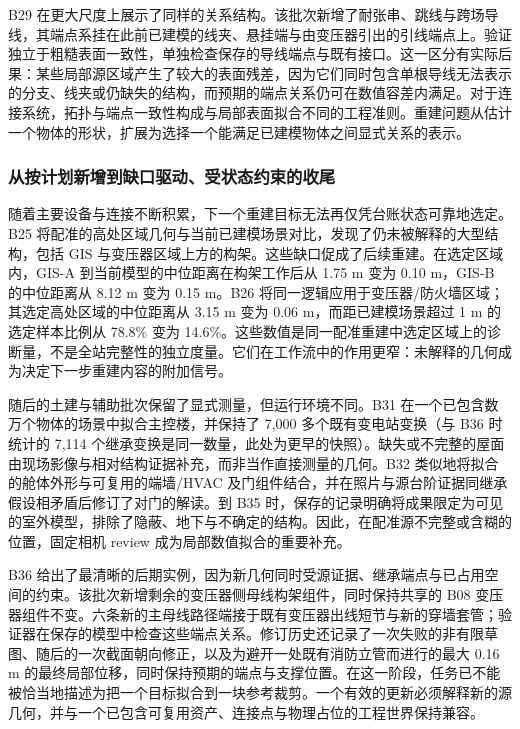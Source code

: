 \documentclass[10pt,a4paper]{article}
\begin{document}
B29
在更大尺度上展示了同样的关系结构。该批次新增了耐张串、跳线与跨场导线，其端点系挂在此前已建模的线夹、悬挂端与由变压器引出的引线端点上。验证独立于粗糙表面一致性，单独检查保存的导线端点与既有接口。这一区分有实际后果：某些局部源区域产生了较大的表面残差，因为它们同时包含单根导线无法表示的分支、线夹或仍缺失的结构，而预期的端点关系仍可在数值容差内满足。对于连接系统，拓扑与端点一致性构成与局部表面拟合不同的工程准则。重建问题从估计一个物体的形状，扩展为选择一个能满足已建模物体之间显式关系的表示。

\hypertarget{ux4eceux6309ux8ba1ux5212ux65b0ux589eux5230ux7f3aux53e3ux9a71ux52a8ux53d7ux72b6ux6001ux7ea6ux675fux7684ux6536ux5c3e}{%
\subsubsection{从按计划新增到缺口驱动、受状态约束的收尾}\label{ux4eceux6309ux8ba1ux5212ux65b0ux589eux5230ux7f3aux53e3ux9a71ux52a8ux53d7ux72b6ux6001ux7ea6ux675fux7684ux6536ux5c3e}}

随着主要设备与连接不断积累，下一个重建目标无法再仅凭台账状态可靠地选定。B25
将配准的高处区域几何与当前已建模场景对比，发现了仍未被解释的大型结构，包括
GIS 与变压器区域上方的构架。这些缺口促成了后续重建。在选定区域内，GIS-A
到当前模型的中位距离在构架工作后从 1.75 m 变为 0.10 m，GIS-B
的中位距离从 8.12 m 变为 0.15 m。B26
将同一逻辑应用于变压器/防火墙区域；其选定高处区域的中位距离从 3.15 m
变为 0.06 m，而距已建模场景超过 1 m 的选定样本比例从 78.8\% 变为
14.6\%。这些数值是同一配准重建中选定区域上的诊断量，不是全站完整性的独立度量。它们在工作流中的作用更窄：未解释的几何成为决定下一步重建内容的附加信号。

随后的土建与辅助批次保留了显式测量，但运行环境不同。B31
在一个已包含数万个物体的场景中拟合主控楼，并保持了 7,000
多个既有变电站变换（与 B36 时统计的 7,114
个继承变换是同一数量，此处为更早的快照）。缺失或不完整的屋面由现场影像与相对结构证据补充，而非当作直接测量的几何。B32
类似地将拟合的舱体外形与可复用的端墙/HVAC
及门组件结合，并在照片与源台阶证据同继承假设相矛盾后修订了对门的解读。到
B35
时，保存的记录明确将成果限定为可见的室外模型，排除了隐蔽、地下与不确定的结构。因此，在配准源不完整或含糊的位置，固定相机
review 成为局部数值拟合的重要补充。

B36
给出了最清晰的后期实例，因为新几何同时受源证据、继承端点与已占用空间的约束。该批次新增剩余的变压器侧母线构架组件，同时保持共享的
B08
变压器组件不变。六条新的主母线路径端接于既有变压器出线短节与新的穿墙套管；验证器在保存的模型中检查这些端点关系。修订历史还记录了一次失败的非有限草图、随后的一次截面朝向修正，以及为避开一处既有消防立管而进行的最大
0.16 m
的最终局部位移，同时保持预期的端点与支撑位置。在这一阶段，任务已不能被恰当地描述为把一个目标拟合到一块参考裁剪。一个有效的更新必须解释新的源几何，并与一个已包含可复用资产、连接点与物理占位的工程世界保持兼容。
\end{document}
